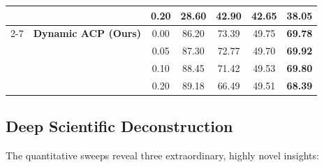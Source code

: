\documentclass{article}
\theoremstyle{plain}
\theoremstyle{definition}
\theoremstyle{remark}
\begin{document}
\begin{table}[h]
\begin{center}
\begin{small}
\begin{sc}
\begin{tabular}{llccccc}
& & 0.20 & 28.60 & 42.90 & 42.65 & 38.05 \\
\cmidrule{2-7}
& \textbf{Dynamic ACP (Ours)} & 0.00 & 86.20 & 73.39 & 49.75 & \textbf{69.78} \\
& & 0.05 & 87.30 & 72.77 & 49.70 & \textbf{69.92} \\
& & 0.10 & 88.45 & 71.42 & 49.53 & \textbf{69.80} \\
& & 0.20 & 89.18 & 66.49 & 49.51 & \textbf{68.39} \\
\bottomrule
\end{tabular}
\end{sc}
\end{small}
\end{center}
\vskip -0.1in
\end{table}

\subsection{Deep Scientific Deconstruction}
The quantitative sweeps reveal three extraordinary, highly novel insights:
\end{document}
